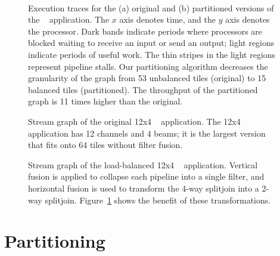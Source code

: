 \begin{figure}
   \\
  \hspace{0.3in}  \vspace{-6pt} \caption{\protect\small Execution
    traces for the (a) original and (b) partitioned versions of the
    \Radar~ application.  The $x$ axis denotes time, and the $y$ axis
    denotes the processor.  Dark bands indicate periods where
    processors are blocked waiting to receive an input or send an
    output; light regions indicate periods of useful work.  The thin
    stripes in the light regions represent pipeline stalls.  Our
    partitioning algorithm decreases the granularity of the graph from
    53 unbalanced tiles (original) to 15 balanced tiles (partitioned).
    The throughput of the partitioned graph is 11 times higher than
    the original. \protect\label{fig:beam-blood}}
\vspace{-12pt}
\end{figure}

\begin{figure}
\centering
{}
\caption{\protect\small Stream graph of the original 12x4 \Radar~
application.  The 12x4 \Radar application has 12 channels and 4 beams;
it is the largest version that fits onto 64 tiles without filter
fusion.  \protect\label{fig:beam-orig}}
\vspace{36pt}
\caption{\protect\small Stream graph of the load-balanced 12x4
\Radar~ application.  Vertical fusion is applied to collapse each pipeline
into a single filter, and horizontal fusion is used to transform the
4-way splitjoin into a 2-way splitjoin.  Figure~\ref{fig:beam-blood}
shows the benefit of these
transformations. \protect\label{fig:beam-opt}}
\end{figure}

\section{Partitioning}
\label{sec:partition}

